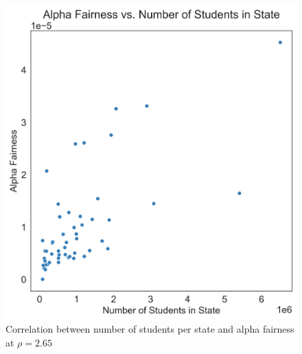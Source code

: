 \begin{figure}[!ht]
	\centering
	\includegraphics[width=0.6\linewidth]{images/af_vs_num_students_per_state}
	\caption{Correlation between number of students per state and alpha fairness at $\rho=2.65$}
	\label{fig:corr_fair_num_students}
\end{figure}
